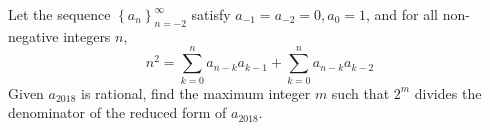 Let the sequence $\left \{ a_n \right \}_{n = -2}^\infty$ satisfy $a_{-1} = a_{-2} = 0, a_0 = 1$,  and for all non-negative integers $n$, $$n^2 = \sum_{k = 0}^n a_{n - k}a_{k - 1} + \sum_{k = 0}^n a_{n - k}a_{k - 2}$$Given $a_{2018}$ is rational, find the maximum integer $m$ such that $2^m$ divides the denominator of the reduced form of $a_{2018}$.